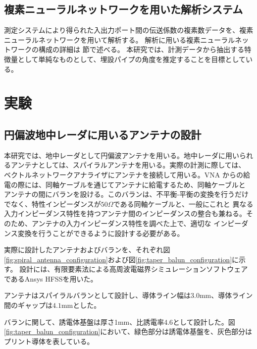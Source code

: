 \documentclass[11pt,a4paper,uplatex,draft]{ujarticle}
\begin{document}
  \newpage

  \subsection{複素ニューラルネットワークを用いた解析システム}

    測定システムにより得られた入出力ポート間の伝送係数の複素数データを、複素ニューラルネットワークを用いて解析する。
    解析に用いる複素ニューラルネットワークの構成の詳細は \label{sec:analysis} 節で述べる。
    本研究では、計測データから抽出する特徴量として単純なものとして、埋設パイプの角度を推定することを目標としている。

\section{実験}

  \subsection{円偏波地中レーダに用いるアンテナの設計}

  本研究では、地中レーダとして円偏波アンテナを用いる。地中レーダに用いられるアンテナとしては、スパイラルアンテナを用いる。実際の計測に際しては、
  ベクトルネットワークアナライザにアンテナを接続して用いる。VNA からの給電の際には、同軸ケーブルを通じてアンテナに給電するため、同軸ケーブルと
  アンテナの間にバランを設ける。このバランは、不平衡-平衡の変換を行うだけでなく、特性インピーダンスが$50\Omega$である同軸ケーブルと、一般にこれと
  異なる入力インピーダンス特性を持つアンテナ間のインピーダンスの整合も兼ねる。そのため、アンテナの入力インピーダンス特性を調べた上で、適切な
  インピーダンス変換を行うことができるように設計する必要がある。

  実際に設計したアンテナおよびバランを、それぞれ図\ref{fig:spiral_antenna_configuration}および図\ref{fig:taper_balun_configuration}に示す。
  設計には、有限要素法による高周波電磁界シミュレーションソフトウェアであるAnsys HFSSを用いた。

  アンテナはスパイラルバランとして設計し、導体ライン幅は$3.0\mathrm{mm}$、導体ライン間のギャップは$4.1\mathrm{mm}$とした。
  
  バランに関して、誘電体基盤は厚さ1mm、比誘電率4.6として設計した。図\ref{fig:taper_balun_configuration}において、緑色部分は誘電体基盤を、灰色部分は
  プリント導体を表している。
\end{document}
